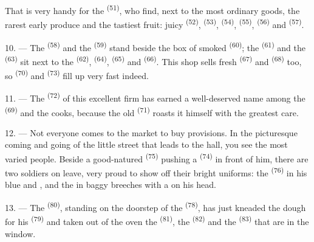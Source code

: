That is very handy for the  \textsuperscript{(51)}, who find, next to the
most ordinary goods, the rarest early produce and the tastiest fruit: juicy 
\textsuperscript{(52)},  \textsuperscript{(53)}, 
\textsuperscript{(54)},  \textsuperscript{(55)}, 
\textsuperscript{(56)} and
 \textsuperscript{(57)}.

\VUsaut{4.0mm}
\VUsaut{3.0mm}

10. --- The  \textsuperscript{(58)} and the 
\textsuperscript{(59)} stand beside the box of smoked 
\textsuperscript{(60)}; the  \textsuperscript{(61)} and the 
\textsuperscript{(63)} sit next to the
 \textsuperscript{(62)},  \textsuperscript{(64)}, 
\textsuperscript{(65)} and  \textsuperscript{(66)}. This shop sells fresh
 \textsuperscript{(67)} and  \textsuperscript{(68)} too, so
 \textsuperscript{(70)} and  \textsuperscript{(73)} fill
up very fast indeed.

11. --- The  \textsuperscript{(72)} of this excellent firm has earned a
well-deserved name among the  \textsuperscript{(69)} and the cooks, because the
old  \textsuperscript{(71)} roasts it himself with the greatest care.

\VUsaut{4.0mm}
\VUsaut{3.0mm}

12. --- Not everyone comes to the market to buy provisions. In the picturesque coming and
going of the little street that leads to the hall, you see the most varied people. Beside a
good-natured
 \textsuperscript{(75)} pushing a 
\textsuperscript{(74)} in front of him, there are two soldiers on leave, very proud to show
off their bright uniforms: the  \textsuperscript{(76)} in his blue
 and , and the
 in baggy breeches with a  on his
head.

13. --- The  \textsuperscript{(80)}, standing on the doorstep of the
 \textsuperscript{(78)}, has just kneaded the dough for his 
\textsuperscript{(79)} and taken out of the oven the 
\textsuperscript{(81)}, the  \textsuperscript{(82)} and the
 \textsuperscript{(83)} that are in the window.

